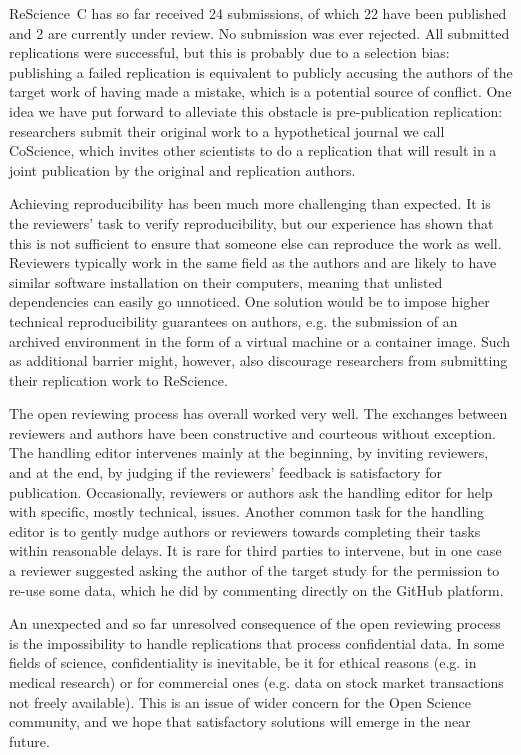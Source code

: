 \documentclass[runningheads]{llncs}
\begin{document}
ReScience~C has so far received 24 submissions, of which 22 have been published and 2 are currently under review. No submission was ever rejected. All submitted replications were successful, but this is probably due to a selection bias: publishing a failed replication is equivalent to publicly accusing the authors of the target work of having made a mistake, which is a potential source of conflict. One idea we have put forward to alleviate this obstacle is pre-publication replication: researchers submit their original work to a hypothetical journal we call CoScience, which invites other scientists to do a replication that will result in a joint publication by the original and replication authors.

Achieving reproducibility has been much more challenging than expected. It is the reviewers' task to verify reproducibility, but our experience has shown that this is not sufficient to ensure that someone else can reproduce the work as well. Reviewers typically work in the same field as the authors and are likely to have similar software installation on their computers, meaning that unlisted dependencies can easily go unnoticed. One solution would be to impose higher technical reproducibility guarantees on authors, e.g. the submission of an archived environment in the form of a virtual machine or a container image. Such as additional barrier might, however, also discourage researchers from submitting their replication work to ReScience.

The open reviewing process has overall worked very well. The exchanges between reviewers and authors have been constructive and courteous without exception. The handling editor intervenes mainly at the beginning, by inviting reviewers, and at the end, by judging if the reviewers' feedback is satisfactory for publication. Occasionally, reviewers or authors ask the handling editor for help with specific, mostly technical, issues. Another common task for the handling editor is to gently nudge authors or reviewers towards completing their tasks within reasonable delays. It is rare for third parties to intervene, but in one case a reviewer suggested asking the author of the target study for the permission to re-use some data, which he did by commenting directly on the GitHub platform.

An unexpected and so far unresolved consequence of the open reviewing process is the impossibility to handle replications that process confidential data. In some fields of science, confidentiality is inevitable, be it for ethical reasons (e.g. in medical research) or for commercial ones (e.g. data on stock market transactions not freely available). This is an issue of wider concern for the Open Science community, and we hope that satisfactory solutions will emerge in the near future.
\end{document}
